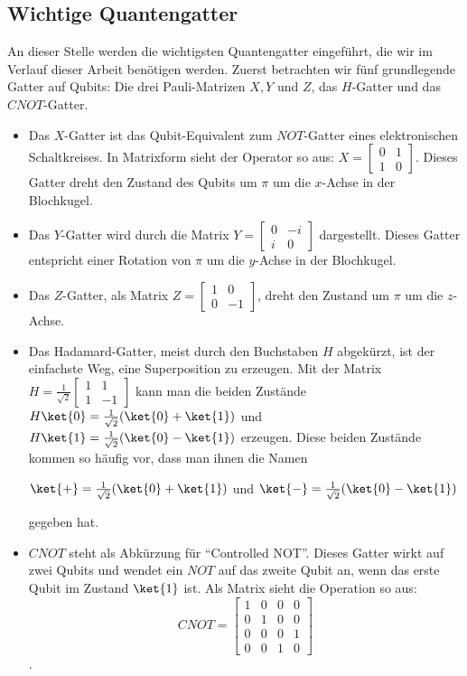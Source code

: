 \subsection{Wichtige Quantengatter}
An dieser Stelle werden die wichtigsten Quantengatter eingeführt, die wir im Verlauf dieser Arbeit benötigen werden. Zuerst betrachten wir fünf grundlegende Gatter auf Qubits: Die drei Pauli-Matrizen $X, Y$ und $Z$, das $H$-Gatter und das $CNOT$-Gatter.
\begin{itemize}
    \item Das $X$-Gatter ist das Qubit-Equivalent zum $NOT$-Gatter eines elektronischen Schaltkreises. In Matrixform sieht der Operator so aus: $ X = \begin{bmatrix}0 & 1 \\ 1 & 0\end{bmatrix}$. Dieses Gatter dreht den Zustand des Qubits um $\pi$ um die $x$-Achse in der Blochkugel.
    \item Das $Y$-Gatter wird durch die Matrix $Y = \begin{bmatrix}0 & -i \\ i & 0\end{bmatrix}$ dargestellt. Dieses Gatter entspricht einer Rotation von $\pi$ um die $y$-Achse in der Blochkugel.
    \item Das $Z$-Gatter, als Matrix $Z = \begin{bmatrix}1 & 0 \\ 0 & -1\end{bmatrix}$, dreht den Zustand um $\pi$ um die $z$-Achse.
    \item Das Hadamard-Gatter, meist durch den Buchstaben $H$ abgekürzt, ist der einfachste Weg, eine Superposition zu erzeugen. Mit der Matrix $H = \frac{1}{\sqrt{2}}\begin{bmatrix}1 & 1 \\ 1 & -1\end{bmatrix}$ kann man die beiden Zustände $H\ket{0} = \frac{1}{\sqrt{2}}(\ket{0} + \ket{1})$ und $H\ket{1} = \frac{1}{\sqrt{2}}(\ket{0} - \ket{1})$ erzeugen. Diese beiden Zustände kommen so häufig vor, dass man ihnen die Namen \vspace{0.2cm}
    
    \centerline{\quad $\ket{+} = \frac{1}{\sqrt{2}}(\ket{0} + \ket{1})$ \quad und \quad $\ket{-} = \frac{1}{\sqrt{2}}(\ket{0} - \ket{1})$ \quad}
    
    gegeben hat.
    \item $CNOT$ steht als Abkürzung für "`Controlled NOT"'. Dieses Gatter wirkt auf zwei Qubits und wendet ein $NOT$ auf das zweite Qubit an, wenn das erste Qubit im Zustand $\ket{1}$ ist. Als Matrix sieht die Operation so aus: $$CNOT = \begin{bmatrix}1 & 0 & 0 & 0 \\ 0 & 1 & 0 & 0 \\ 0 & 0 & 0 & 1 \\ 0 & 0 & 1 & 0\end{bmatrix}$$.
\end{itemize}
